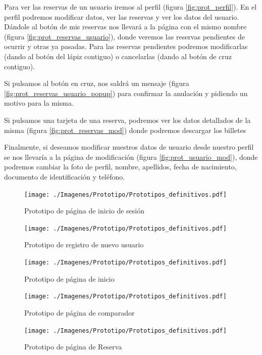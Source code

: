 Para ver las reservas de un usuario iremos al perfil (figura \ref{fig:prot_perfil}). En el perfil podremos modificar datos, ver las reservas y ver los datos del usuario. Dándole al botón de mis reservas nos llevará a la página con el mismo nombre (figura \ref{fig:prot_reservas_usuario}), donde veremos las reservas pendientes de ocurrir y otras ya pasadas. Para las reservas pendientes podremos modificarlas (dando al botón del lápiz contiguo) o cancelarlas (dando al botón de cruz contiguo).

Si pulsamos al botón en cruz, nos saldrá un mensaje (figura \ref{fig:prot_reservas_usuario_popup}) para confirmar la anulación y pidiendo un motivo para la misma.

Si pulsamos una tarjeta de una reserva, podremos ver los datos detallados de la misma (figura \ref{fig:prot_reservas_mod}) donde podremos descargar los billetes


Finalmente, si deseamos modificar nuestros datos de usuario desde nuestro perfil se nos llevaría a la página de modificación (figura \ref{fig:prot_usuario_mod}), donde podremos cambiar la foto de perfil, nombre, apellidos, fecha de nacimiento, documento de identificación y teléfono.

\begin{figure}[H]
    \centering
    \texttt{[image: ./Imagenes/Prototipo/Prototipos\_definitivos.pdf]}
    \caption{Prototipo de página de inicio de sesión}
    \label{fig:prot_ses}
\end{figure}

\begin{figure}[H]
    \centering
    \texttt{[image: ./Imagenes/Prototipo/Prototipos\_definitivos.pdf]}
    \caption{Prototipo de registro de nuevo usuario}
    \label{fig:prot_reg}
\end{figure}

\begin{figure}[H]
    \centering
    \texttt{[image: ./Imagenes/Prototipo/Prototipos\_definitivos.pdf]}
    \caption{Prototipo de página de inicio}
    \label{fig:prot_inicio}
\end{figure}

\begin{figure}[H]
    \centering
    \texttt{[image: ./Imagenes/Prototipo/Prototipos\_definitivos.pdf]}
    \caption{Prototipo de página de comparador}
    \label{fig:prot_comp}
\end{figure}

\begin{figure}[H]
    \centering
    \texttt{[image: ./Imagenes/Prototipo/Prototipos\_definitivos.pdf]}
    \caption{Prototipo de página de Reserva}
    \label{fig:prot_reser}
\end{figure}

